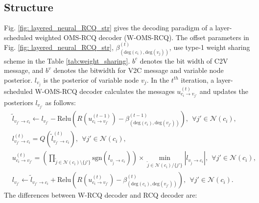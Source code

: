 \documentclass [PhD] {uclathes}
\begin{document}
\subsection{Structure}
Fig. \ref{fig: layered_neural_RCQ_str} gives the decoding paradigm of a layer-scheduled weighted OMS-RCQ decoder (W-OMS-RCQ).
The offset parameters in Fig. \ref{fig: layered_neural_RCQ_str}, $\beta^{(t)}_{({\mathrm{deg}}(c_i),{\mathrm{deg}}(v_j))}$, use type-1 weight sharing scheme in the Table \ref{tab:weight_sharing}. $b^c$ denotes the bit width of C2V message,  and $b^v$ denotes the bitwidth for V2C message and variable node posterior. 
$l_{v_j}$ is the posterior of variable node $v_j$. 
In the $t^{th}$ iteration, a layer-scheduled W-OMS-RCQ decoder calculates the messages $u^{(t)}_{c_i\rightarrow v_{j'}}$ and updates the posteriors $l_{v_{j'}}$ as follows: 
\begingroup
\allowdisplaybreaks
\begin{align}
     &{\tilde{l}}_{v_{j'} \rightarrow c_{i}} \leftarrow  l_{v_{j'}}-{\mathrm{Relu}}\left( R\left(u^{(t-1)}_{c_i\rightarrow v_{j'}}\right)-\beta^{(t-1)}_{({\mathrm{deg}}(c_i),{\mathrm{deg}}(v_{j'}))}\right),~~\forall j'\in\mathcal{N}(c_i),\\
     &{l}^{(t)}_{v_{j'}\rightarrow c_i} = Q\left(\tilde{l}^{(t)}_{v_{j'}\rightarrow c_i}\right),~~\forall j'\in\mathcal{N}(c_i),\\
    &u^{(t)}_{c_i\rightarrow v_{j'}} =
    \left(\prod_{\tilde{j}\in\mathcal{N}(c_i)\setminus\{{j'}\}}{\mathrm{sgn}}\left(l_{v_{\tilde{j}}\rightarrow c_i}\right)\right)\times \min_{\tilde{j}\in\mathcal{N}(c_i)/\{{j'}\}}\left|l_{v_{\tilde{j}}\rightarrow c_i}\right|,~~\forall j'\in\mathcal{N}(c_i), \\
    &l_{v_{j'}} \leftarrow  {\tilde{l}}_{v_{j'}\rightarrow c_i}+{\mathrm{Relu}}\left( R\left(u^{(t)}_{c_i\rightarrow v_{j'}}\right)-\beta^{(t)}_{(\text{deg}(c_i),\text{deg}(v_{j'}))}\right), ~~\forall j'\in\mathcal{N}(c_i).
\end{align}
\endgroup
The differences between W-RCQ decoder and RCQ decoder are:
\end{document}

